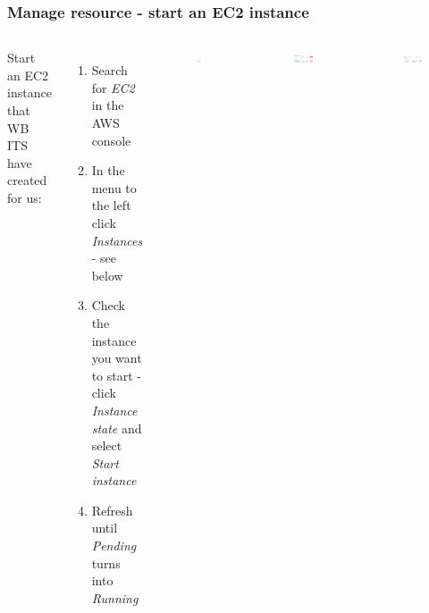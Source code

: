 \documentclass[aspectratio=169]{beamer} %
\begin{document}
\begin{frame}
	\frametitle{Manage resource - start an EC2 instance}

	\begin{columns}[c]


		Start an EC2 instance that WB ITS have created for us:

		\begin{enumerate}
			\item Search for \textit{EC2} in the AWS console
			\item In the menu to the left click \textit{Instances} - see below
			\item Check the instance you want to start
			- click \textit{Instance state} and select \textit{Start instance}
			\item Refresh until \textit{Pending} turns into \textit{Running}

		\end{enumerate}

		\begin{figure}
			\centering
			\includegraphics[width=.4\textwidth]{./img/ec2-1.png}
		\end{figure}

		\begin{figure}
			\centering
			\includegraphics[width=1\textwidth]{./img/ec2-2.png}
		\end{figure}
		\begin{figure}
			\centering
			\includegraphics[width=1\textwidth]{./img/ec2-3.png}
		\end{figure}
		\vspace{.5cm}

	\end{columns}
\end{frame}
\end{document}
